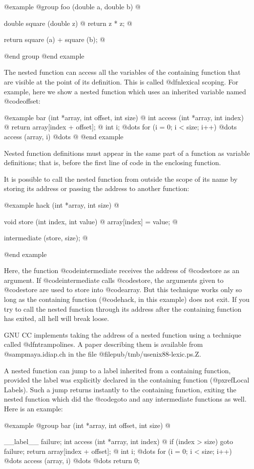 {@example
@group
foo (double a, double b)
@{
  double square (double z) @{ return z * z; @}

  return square (a) + square (b);
@}
@end group
@end example

The nested function can access all the variables of the containing
function that are visible at the point of its definition.  This is
called @dfn{lexical scoping}.  For example, here we show a nested
function which uses an inherited variable named @code{offset}:

@example
bar (int *array, int offset, int size)
@{
  int access (int *array, int index)
    @{ return array[index + offset]; @}
  int i;
  @dots{}
  for (i = 0; i < size; i++)
    @dots{} access (array, i) @dots{}
@}
@end example

Nested function definitions must appear in the same part of a function
as variable definitions; that is, before the first line of code in the
enclosing function.

It is possible to call the nested function from outside the scope of its
name by storing its address or passing the address to another function:

@example
hack (int *array, int size)
@{
  void store (int index, int value)
    @{ array[index] = value; @}

  intermediate (store, size);
@}
@end example

Here, the function @code{intermediate} receives the address of
@code{store} as an argument.  If @code{intermediate} calls
@code{store}, the arguments given to @code{store} are used to store
into @code{array}.  But this technique works only so long as the
containing function (@code{hack}, in this example) does not exit.  If
you try to call the nested function through its address after the
containing function has exited, all hell will break loose.

GNU CC implements taking the address of a nested function using a
technique called @dfn{trampolines}.  A paper describing them is
available from @samp{maya.idiap.ch} in the file
@file{pub/tmb/usenix88-lexic.ps.Z}.

A nested function can jump to a label inherited from a containing
function, provided the label was explicitly declared in the containing
function (@pxref{Local Labels}).  Such a jump returns instantly to the
containing function, exiting the nested function which did the
@code{goto} and any intermediate functions as well.  Here is an example:

@example
@group
bar (int *array, int offset, int size)
@{
  __label__ failure;
  int access (int *array, int index)
    @{
      if (index > size)
        goto failure;
      return array[index + offset];
    @}
  int i;
  @dots{}
  for (i = 0; i < size; i++)
    @dots{} access (array, i) @dots{}
  @dots{}
  return 0;

}}
